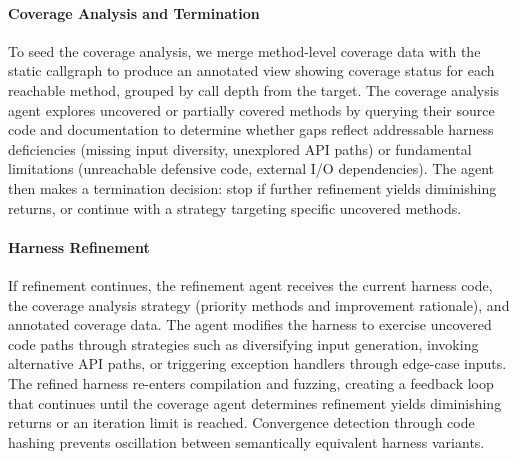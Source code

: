 \paragraph{Coverage Analysis and Termination}
To seed the coverage analysis, we merge method-level coverage data with the static callgraph to produce an annotated view showing coverage status for each reachable method, grouped by call depth from the target. The coverage analysis agent explores uncovered or partially covered methods by querying their source code and documentation to determine whether gaps reflect addressable harness deficiencies (missing input diversity, unexplored API paths) or fundamental limitations (unreachable defensive code, external I/O dependencies). The agent then makes a termination decision: stop if further refinement yields diminishing returns, or continue with a strategy targeting specific uncovered methods.

\paragraph{Harness Refinement}
If refinement continues, the refinement agent receives the current harness code, the coverage analysis strategy (priority methods and improvement rationale), and annotated coverage data. The agent modifies the harness to exercise uncovered code paths through strategies such as diversifying input generation, invoking alternative API paths, or triggering exception handlers through edge-case inputs. The refined harness re-enters compilation and fuzzing, creating a feedback loop that continues until the coverage agent determines refinement yields diminishing returns or an iteration limit is reached. Convergence detection through code hashing prevents oscillation between semantically equivalent harness variants.
